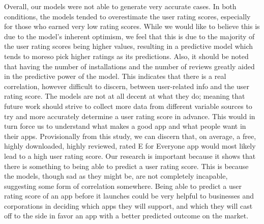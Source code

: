 \documentclass[]{article}
\begin{document}
Overall, our models were not able to generate very accurate cases. In
both conditions, the models tended to overestimate the user rating
scores, especially for those who earned very low rating scores. While we
would like to believe this is due to the model's inherent optimism, we
feel that this is due to the majority of the user rating scores being
higher values, resulting in a predictive model which tends to moreso
pick higher ratings as its predictions. Also, it should be noted that
having the number of installations and the number of reviews greatly
aided in the predictive power of the model. This indicates that there is
a real correlation, however difficult to discern, between user-related
info and the user rating score. The models are not at all decent at what
they do; meaning that future work should strive to collect more data
from different variable sources to try and more accurately determine a
user rating score in advance. This would in turn force us to understand
what makes a good app and what people want in their apps. Provisionally
from this study, we can discern that, on average, a free, highly
downloaded, highly reviewed, rated E for Everyone app would most likely
lead to a high user rating score. Our research is important because it
shows that there is something to being able to predict a user rating
score. This is because the models, though sad as they might be, are not
completely incapable, suggesting some form of correlation somewhere.
Being able to predict a user rating score of an app before it launches
could be very helpful to businesses and corporations in deciding which
apps they will support, and which they will cast off to the side in
favor an app with a better predicted outcome on the market.
\end{document}
